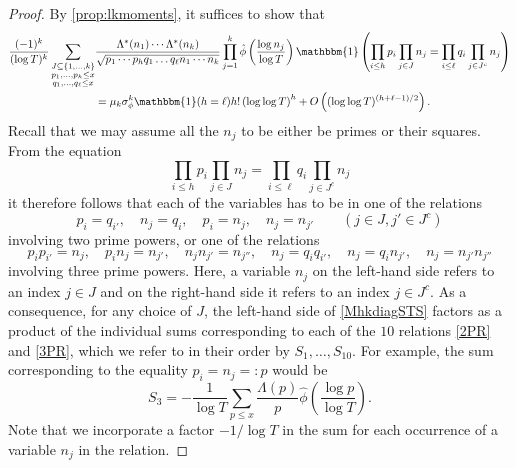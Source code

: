 \documentclass[12pt,oneside,english,a4paper]{amsart}
\theoremstyle{remark}
\numberwithin{equation}{section}
\begin{document}
\begin{proof}
By \cref{prop:lkmoments}, it suffices to show that
\begin{equation}\begin{split}\label{MhkdiagSTS}
    \frac{(-1)^k}{(\log T)^k} 
        \sum_{\substack{J\subseteq \{1, \dots, k\}\\p_1, \dots, p_h\leq x\\
        q_1, \dots, q_\ell\leq x}} &\frac{\Lambda^*(n_1) \cdots \Lambda^*(n_k)}{\sqrt{p_1\cdots p_h q_1\dots q_\ell n_1 \cdots n_k}} \prod_{j=1}^k  \hat\phi\left(\frac{\log n_j}{\log T}\right) \mathbbm{1} \left( \prod_{i\leq h} p_i \prod_{j \in J} n_j = \prod_{i\leq \ell} q_i \prod_{j\in J^c} n_j \right)\\
        &= \mu_k \sigma_\phi^k \mathbbm{1}(h = \ell) h! \left( \log\log T \right)^{h} + O \left( (\log\log T)^{(h + \ell -1)/2} \right).
\end{split}\end{equation}
    Recall that we may assume all the $n_j$ to be either be primes or their squares. From the equation 
    \[ \prod_{i\leq h} p_i \prod_{j \in J} n_j = \prod_{i\leq \ell} q_i \prod_{j\in J^c} n_j  \]
    it therefore follows that each of the variables has to be in one of the relations
    \begin{equation}\label{2PR}
        p_i = q_{i'},\quad n_j = q_i, \quad p_i = n_j, \quad n_j = n_{j'} \qquad (j\in J, j'\in J^c)
    \end{equation}
    involving two prime powers, or one of the relations
    \begin{equation}\label{3PR}
        p_i p_{i'} = n_j, \quad p_i n_j = n_{j'}, \quad n_j n_{j'} = n_{j''}, \quad n_j = q_i q_{i'}, \quad n_j = q_i n_{j'}, \quad n_j = n_{j'} n_{j''}
    \end{equation}
    involving three prime powers. Here, a variable $n_j$ on the left-hand side refers to an index $j \in J$ and on the right-hand side it refers to an index $j \in J^c$. 
    As a consequence, for any choice of $J$, the left-hand side of \eqref{MhkdiagSTS} factors as a product of the individual sums corresponding to each of the $10$ relations \eqref{2PR} and \eqref{3PR}, which we refer to in their order by $S_1,\dots, S_{10}$. For example, the sum corresponding to the equality $p_i = n_j =: p$ would be
    \[ S_3 = -\frac{1}{\log T} \sum_{p \le x} \frac{\Lambda(p)}{p} \hat \phi \left( \frac{\log p}{\log T} \right). \]
    Note that we incorporate a factor $-1/\log T$ in the sum for each occurrence of a variable $n_j$ in the relation.
    

\end{proof}
\end{document}
